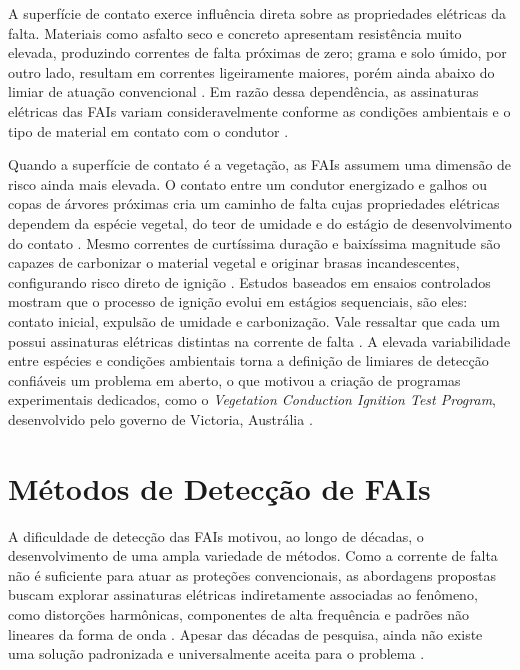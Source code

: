 A superfície de contato exerce influência direta sobre as propriedades elétricas da
falta. Materiais como asfalto seco e concreto apresentam resistência muito elevada,
produzindo correntes de falta próximas de zero; grama e solo úmido, por outro lado,
resultam em correntes ligeiramente maiores, porém ainda abaixo do limiar de atuação
convencional \cite{Aljohani2020, Sedighizadeh2010}. Em razão dessa dependência, as
assinaturas elétricas das FAIs variam consideravelmente conforme as condições ambientais
e o tipo de material em contato com o condutor \cite{Aljohani2020}.

Quando a superfície de contato é a vegetação, as FAIs assumem uma dimensão de risco
ainda mais elevada. O contato entre um condutor energizado e galhos ou copas de árvores
próximas cria um caminho de falta cujas propriedades elétricas dependem da espécie
vegetal, do teor de umidade e do estágio de desenvolvimento do contato
\cite{Ozansoy2020, 9}. Mesmo correntes de curtíssima duração e baixíssima magnitude
são capazes de carbonizar o material vegetal e originar brasas incandescentes,
configurando risco direto de ignição \cite{8, Ozansoy2020}. Estudos baseados em
ensaios controlados mostram que o processo de ignição evolui em estágios sequenciais, são eles: contato inicial, expulsão de umidade e carbonização. Vale ressaltar que cada um possui assinaturas
elétricas distintas na corrente de falta \cite{Ozansoy2020, Ozansoy2023}. A elevada
variabilidade entre espécies e condições ambientais torna a definição de limiares de
detecção confiáveis um problema em aberto, o que motivou a criação de programas
experimentais dedicados, como o \textit{Vegetation Conduction Ignition Test Program},
desenvolvido pelo governo de Victoria, Austrália \cite{vic_bushfire_report, 8}.

\section{Métodos de Detecção de FAIs}\label{sec:metodos}

A dificuldade de detecção das FAIs motivou, ao longo de décadas, o
desenvolvimento de uma ampla variedade de métodos. Como a corrente de falta não é
suficiente para atuar as proteções convencionais, as abordagens propostas buscam
explorar assinaturas elétricas indiretamente associadas ao fenômeno, como distorções
harmônicas, componentes de alta frequência e padrões não lineares da forma de onda
\cite{Sedighizadeh2010, Aljohani2020}. Apesar das décadas de pesquisa, ainda não existe
uma solução padronizada e universalmente aceita para o problema \cite{Sedighizadeh2010}.

